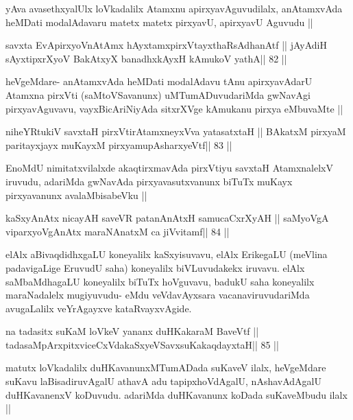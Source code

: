 \begin{artha}
yAva avasethxyalUlx loVkadalilx Atamxnu apirxyavAguvudilalx,
anAtamxvAda heMDati modalAdavaru matetx matetx pirxyavU, apirxyavU
Aguvudu ||
\end{artha}

\begin{shl}
savxta EvApirxyoV\s nAtAmx hAyxtamxpirxVtayxthaRsAdhanAtf ||
jAyAdiH sAyxtipxrXyoV BakAtxyX banadhxkAyxH kAmukoV yathA\hfill || 82 ||
\end{shl}

\begin{artha}
heVgeMdare- anAtamxvAda heMDati modalAdavu tAnu apirxyavAdarU Atamxna
pirxVti (saMtoVSavanunx) uMTumADuvudariMda gwNavAgi pirxyavAguvavu,
vayxBicAriNiyAda sitxrXVge kAmukanu pirxya eMbuvaMte ||
\end{artha}

\begin{shl}
niheYRtukiV savxtaH pirxVtirAtamxneyxVva yatasatxtaH ||
BAkatxM pirxyaM paritayxjayx muKayxM pirxyamupAsharxyeVtf\hfill || 83 ||
\end{shl}

\begin{artha}
EnoMdU nimitatxvilalxde akaqtirxmavAda pirxVtiyu savxtaH AtamxnalelxV
iruvudu, adariMda gwNavAda pirxyavasutxvanunx biTuTx
muKayx pirxyavanunx avalaMbisabeVku ||
\end{artha}

\begin{shl}
kaSxyAnAtx nicayAH saveVR patanAnAtxH samucaCxrXyAH ||
saMyoVgA viparxyoVgAnAtx maraNAnatxM ca jiVvitamf\hfill || 84 ||
\end{shl}

\begin{artha}
elAlx aBivaqdidhxgaLU koneyalilx kaSxyisuvavu, elAlx ErikegaLU (meVlina
padavigaLige EruvudU saha) koneyalilx biVLuvudakekx iruvavu. elAlx
saMbaMdhagaLU koneyalilx biTuTx hoVguvavu, badukU saha koneyalilx
maraNadalelx mugiyuvudu- eMdu veVdavAyxsara vacanaviruvudariMda
avugaLalilx veYrAgayxve kataRvayxvAgide.
\end{artha}

\begin{shl}
na tadasitx suKaM loVkeV yananx duHKakaraM BaveVtf ||
tadasaMpArxpitxviceCxVdakaSxyeVSavxsuKakaqdayxtaH\hfill || 85 ||
\end{shl}

\begin{artha}
matutx loVkadalilx duHKavanunxMTumADada suKaveV ilalx, heVgeMdare
suKavu laBisadiruvAgalU athavA adu tapipxhoVdAgalU, nAshavAdAgalU
duHKavanenxV koDuvudu. adariMda duHKavanunx koDada suKaveMbudu ilalx ||
\end{artha}

